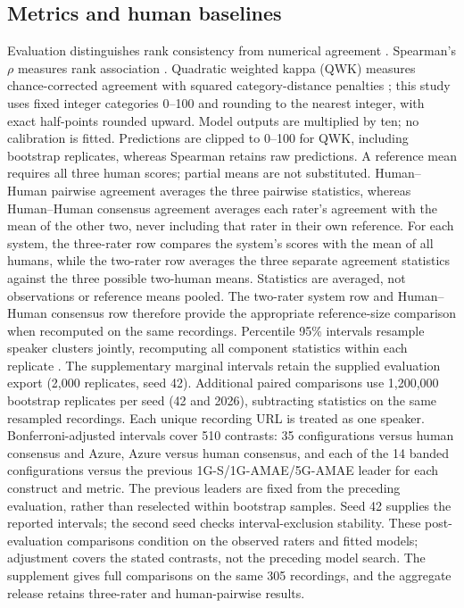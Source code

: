 \documentclass[cameraready]{Interspeech}
\begin{document}
\subsection{Metrics and human baselines}
Evaluation distinguishes rank consistency from numerical agreement \cite{stemler,williamson}. Spearman's $\rho$ measures rank association \cite{spearman}. Quadratic weighted kappa (QWK) measures chance-corrected agreement with squared category-distance penalties \cite{cohen}; this study uses fixed integer categories 0--100 and rounding to the nearest integer, with exact half-points rounded upward. Model outputs are multiplied by ten; no calibration is fitted. Predictions are clipped to 0--100 for QWK, including bootstrap replicates, whereas Spearman retains raw predictions. A reference mean requires all three human scores; partial means are not substituted. Human--Human pairwise agreement averages the three pairwise statistics, whereas Human--Human consensus agreement averages each rater's agreement with the mean of the other two, never including that rater in their own reference. For each system, the three-rater row compares the system's scores with the mean of all humans, while the two-rater row averages the three separate agreement statistics against the three possible two-human means. Statistics are averaged, not observations or reference means pooled. The two-rater system row and Human--Human consensus row therefore provide the appropriate reference-size comparison when recomputed on the same recordings. Percentile 95\% intervals resample speaker clusters jointly, recomputing all component statistics within each replicate \cite{efron,field}. The supplementary marginal intervals retain the supplied evaluation export (2,000 replicates, seed 42). Additional paired comparisons use 1,200,000 bootstrap replicates per seed (42 and 2026), subtracting statistics on the same resampled recordings. Each unique recording URL is treated as one speaker. Bonferroni-adjusted intervals cover 510 contrasts: 35 configurations versus human consensus and Azure, Azure versus human consensus, and each of the 14 banded configurations versus the previous 1G-S/1G-AMAE/5G-AMAE leader for each construct and metric. The previous leaders are fixed from the preceding evaluation, rather than reselected within bootstrap samples. Seed 42 supplies the reported intervals; the second seed checks interval-exclusion stability. These post-evaluation comparisons condition on the observed raters and fitted models; adjustment covers the stated contrasts, not the preceding model search. The supplement gives full comparisons on the same 305 recordings, and the aggregate release retains three-rater and human-pairwise results.
\end{document}
